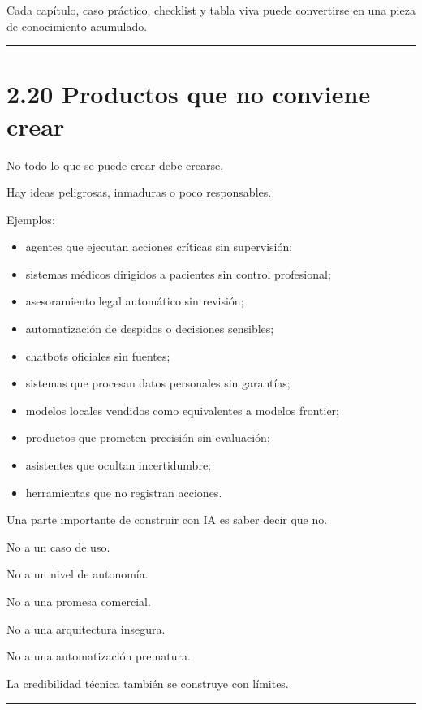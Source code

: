 Cada capítulo, caso práctico, checklist y tabla viva puede convertirse
en una pieza de conocimiento acumulado.

\begin{center}\rule{0.5\linewidth}{0.5pt}\end{center}

\section{2.20 Productos que no conviene
crear}\label{productos-que-no-conviene-crear}

No todo lo que se puede crear debe crearse.

Hay ideas peligrosas, inmaduras o poco responsables.

Ejemplos:

\begin{itemize}
\tightlist
\item
  agentes que ejecutan acciones críticas sin supervisión;
\item
  sistemas médicos dirigidos a pacientes sin control profesional;
\item
  asesoramiento legal automático sin revisión;
\item
  automatización de despidos o decisiones sensibles;
\item
  chatbots oficiales sin fuentes;
\item
  sistemas que procesan datos personales sin garantías;
\item
  modelos locales vendidos como equivalentes a modelos frontier;
\item
  productos que prometen precisión sin evaluación;
\item
  asistentes que ocultan incertidumbre;
\item
  herramientas que no registran acciones.
\end{itemize}

Una parte importante de construir con IA es saber decir que no.

No a un caso de uso.

No a un nivel de autonomía.

No a una promesa comercial.

No a una arquitectura insegura.

No a una automatización prematura.

La credibilidad técnica también se construye con límites.

\begin{center}\rule{0.5\linewidth}{0.5pt}\end{center}

